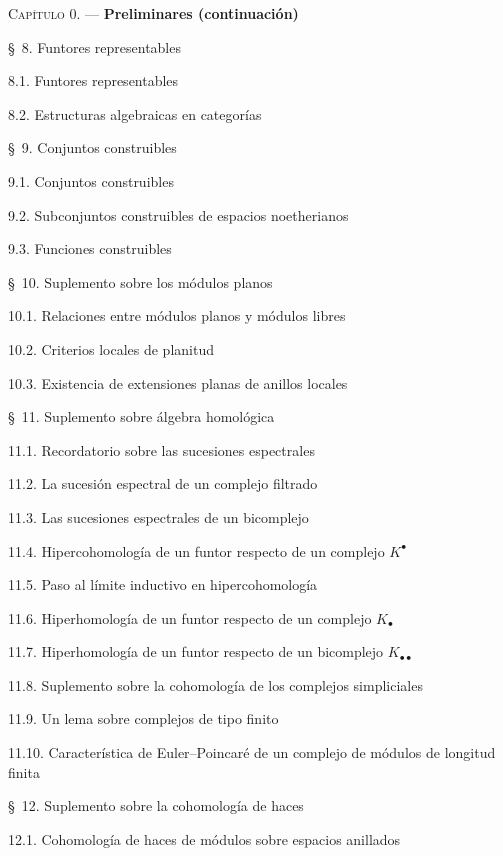 \documentclass[10pt,oneside,openany]{book}
\theoremstyle{egaenv}\newtheorem*{env}{---}
\theoremstyle{egastatement}
\theoremstyle{egadescription}
\begin{document}
\begin{flushleft}
\textsc{Capítulo 0.} --- \textbf{Preliminares (continuación)} 

\medskip
\S~8. Funtores representables 

8.1. Funtores representables 

8.2. Estructuras algebraicas en categorías 

\medskip
\S~9. Conjuntos construibles 

9.1. Conjuntos construibles 

9.2. Subconjuntos construibles de espacios noetherianos 

9.3. Funciones construibles 

\medskip
\S~10. Suplemento sobre los módulos planos 

10.1. Relaciones entre módulos planos y módulos libres 

10.2. Criterios locales de planitud 

10.3. Existencia de extensiones planas de anillos locales 

\medskip
\S~11. Suplemento sobre álgebra homológica 

11.1. Recordatorio sobre las sucesiones espectrales 

11.2. La sucesión espectral de un complejo filtrado 

11.3. Las sucesiones espectrales de un bicomplejo 

11.4. Hipercohomología de un funtor respecto de un complejo $K^\bullet$

11.5. Paso al límite inductivo en hipercohomología 

11.6. Hiperhomología de un funtor respecto de un complejo $K_\bullet$

11.7. Hiperhomología de un funtor respecto de un bicomplejo
$K_{\bullet\bullet}$ 

11.8. Suplemento sobre la cohomología de los complejos simpliciales 

11.9. Un lema sobre complejos de tipo finito 

11.10. Característica de Euler--Poincaré de un complejo de módulos de longitud finita

\medskip
\S~12. Suplemento sobre la cohomología de haces 

12.1. Cohomología de haces de módulos sobre espacios anillados 


\end{flushleft}
\end{document}

